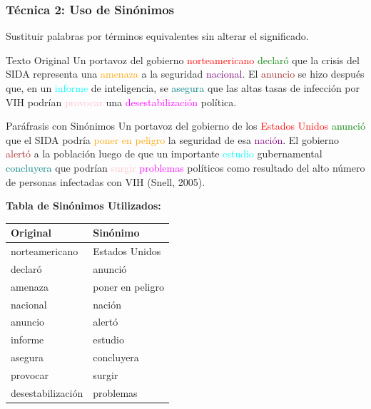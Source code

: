 \documentclass[aspectratio=169]{beamer}
\begin{document}
\begin{frame}[allowframebreaks]
	\frametitle{Técnica 2: Uso de Sinónimos}
	
	Sustituir palabras por términos equivalentes sin alterar el significado.
	
	\framebreak
	
	\begin{exampleblock}{Texto Original}
		\small
		Un portavoz del gobierno \textcolor{red}{norteamericano} \textcolor{green}{declaró} que la crisis del SIDA representa una \textcolor{orange}{amenaza} a la seguridad \textcolor{purple}{nacional}. El \textcolor{brown}{anuncio} se hizo después que, en un \textcolor{cyan}{informe} de inteligencia, se \textcolor{teal}{asegura} que las altas tasas de infección por VIH podrían \textcolor{pink}{provocar} una \textcolor{magenta}{desestabilización} política.
	\end{exampleblock}
	
	\framebreak
	
	\begin{exampleblock}{Paráfrasis con Sinónimos}
		\small
		Un portavoz del gobierno de los \textcolor{red}{Estados Unidos} \textcolor{green}{anunció} que el SIDA podría \textcolor{orange}{poner en peligro} la seguridad de esa \textcolor{purple}{nación}. El gobierno \textcolor{brown}{alertó} a la población luego de que un importante \textcolor{cyan}{estudio} gubernamental \textcolor{teal}{concluyera} que podrían \textcolor{pink}{surgir} \textcolor{magenta}{problemas} políticos como resultado del alto número de personas infectadas con VIH (Snell, 2005).
	\end{exampleblock}
	
	\framebreak
	
	\textbf{Tabla de Sinónimos Utilizados:}
	
	\begin{center}
		\begin{tabular}{ll}
			\toprule
			\textbf{Original} & \textbf{Sinónimo} \\
			\midrule
			norteamericano & Estados Unidos \\
			declaró & anunció \\
			amenaza & poner en peligro \\
			nacional & nación \\
			anuncio & alertó \\
			informe & estudio \\
			asegura & concluyera \\
			provocar & surgir \\
			desestabilización & problemas \\
			\bottomrule
		\end{tabular}
	\end{center}
\end{frame}
\end{document}
